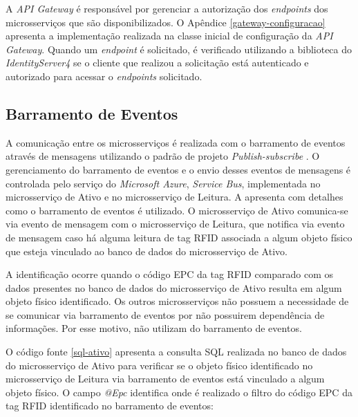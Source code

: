 A \textit{API Gateway} é responsável por gerenciar a autorização dos \textit{endpoints} dos microsserviços que são disponibilizados. O Apêndice \ref{gateway-configuracao} apresenta a implementação realizada na classe inicial de configuração da \textit{API Gateway}. Quando um \textit{endpoint} é solicitado, é verificado utilizando a biblioteca do \textit{IdentityServer4} se o cliente que realizou a solicitação está autenticado e autorizado para acessar o \textit{endpoints} solicitado.

\newpage

\subsection{Barramento de Eventos}

A comunicação entre os microsserviços é realizada com o barramento de eventos através de mensagens utilizando o padrão de projeto \textit{Publish-subscribe} \cite{Dragoni2016} \cite{Richardson2016}. O gerenciamento do barramento de eventos e o envio desses eventos de mensagens é controlada pelo serviço do \textit{Microsoft Azure}, \textit{Service Bus}, implementada no microsserviço de Ativo e no microsserviço de Leitura. A  apresenta com detalhes como o barramento de eventos é utilizado. O microsserviço de Ativo comunica-se via evento de mensagem com o microsserviço de Leitura, que notifica via evento de mensagem caso há alguma leitura de tag \acrshort{RFID} associada a algum objeto físico que esteja vinculado ao banco de dados do microsserviço de Ativo.


A identificação ocorre quando o código \acrshort{EPC} da tag \acrshort{RFID} comparado com os dados presentes no banco de dados do microsserviço de Ativo resulta em algum objeto físico identificado. Os outros microsserviços não possuem a necessidade de se comunicar via barramento de eventos por não possuirem dependência de informações. Por esse motivo, não utilizam do barramento de eventos.

O código fonte \ref{sql-ativo} apresenta a consulta \acrshort{SQL} realizada no banco de dados do microsserviço de Ativo para verificar se o objeto físico identificado no microsserviço de Leitura via barramento de eventos está vinculado a algum objeto físico. O campo \textit{@Epc} identifica onde é realizado o filtro do código \acrshort{EPC} da tag \acrshort{RFID} identificado no barramento de eventos:

